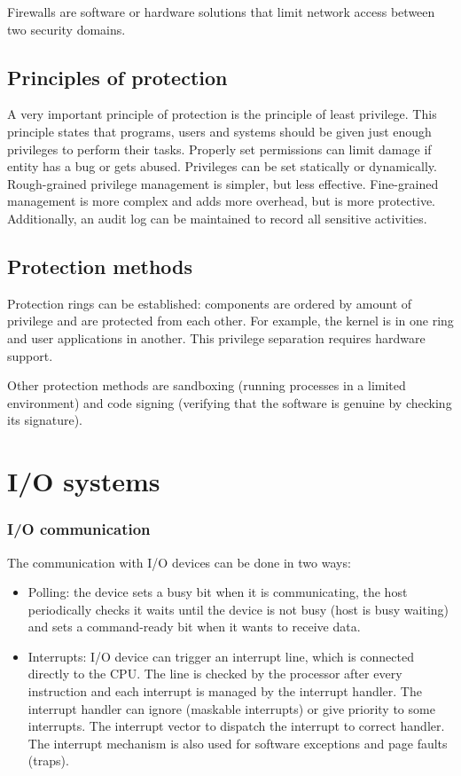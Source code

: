 Firewalls are software or hardware solutions that limit network access between two security domains.

\subsection{Principles of protection}
A very important principle of protection is the principle of least privilege. This principle states that programs, users and systems should be given just enough privileges to perform their tasks. Properly set permissions can limit damage if entity has a bug or gets abused. Privileges can be set statically or dynamically. Rough-grained privilege management is simpler, but less effective. Fine-grained management is more complex and adds more overhead, but is more protective. Additionally, an audit log can be maintained to record all sensitive activities.

\subsection{Protection methods}
Protection rings can be established: components are ordered by amount of privilege and are protected from each other. For example, the kernel is in one ring and user applications in another. This privilege separation requires hardware support.

Other protection methods are sandboxing (running processes in a limited environment) and code signing (verifying that the software is genuine by checking its signature).

\section{I/O systems}
\subsubsection{I/O communication}
The communication with I/O devices can be done in two ways:
\begin{itemize}
    \item Polling: the device sets a busy bit when it is communicating, the host periodically checks it waits until the device is not busy (host is busy waiting) and sets a command-ready bit when it wants to receive data.
    \item Interrupts: I/O device can trigger an interrupt line, which is connected directly to the CPU. The line is checked by the processor after every instruction and each interrupt is managed by the interrupt handler. The interrupt handler can ignore (maskable interrupts) or give priority to some interrupts. The interrupt vector to dispatch the interrupt to correct handler. The interrupt mechanism is also used for software exceptions and page faults (traps).
\end{itemize}

